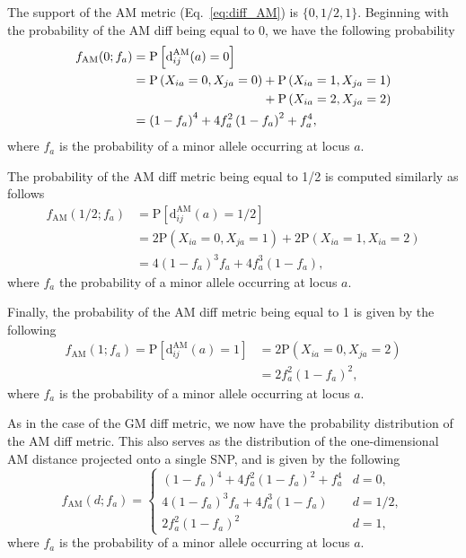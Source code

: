 \documentclass[aos]{imsart}
\begin{document}
The support of the AM metric (Eq.~\ref{eq:diff_AM}) is $\{0,1/2,1\}$. Beginning with the probability of the AM diff being equal to 0, we have the following probability
%
\begin{equation}\label{eq:probAM0}
\begin{aligned}
f_\text{AM}(0;f_a) &= \text{P}\left[\text{d}^\text{AM}_{ij}(a) = 0\right] \\
&= \text{P}\left(X_{ia}=0,X_{ja}=0\right) + \text{P}\left(X_{ia}=1,X_{ja}=1\right) \\
& \hspace{3.64cm} + \text{P}\left(X_{ia}=2,X_{ja}=2\right) \\
&= \left(1 - f_a\right)^4 + 4 f^2_a \left(1 - f_a\right)^2 + f^4_a,
\end{aligned}
\end{equation}
%
where $f_a$ is the probability of a minor allele occurring at locus $a$.

The probability of the AM diff metric being equal to 1/2 is computed similarly as follows
%
\begin{equation}\label{eq:probAM0.5}
\begin{aligned}
f_\text{AM}\left(1/2;f_a\right) &= \text{P}\left[\text{d}^\text{AM}_{ij}(a) = 1/2\right] \\
&= 2\text{P}\left(X_{ia}=0,X_{ja}=1\right) + 2\text{P}\left(X_{ia}=1,X_{ia}=2\right) \\
&= 4 \left(1 - f_a\right)^3 f_a + 4 f^3_a \left(1 - f_a\right),
\end{aligned}
\end{equation}
%
where $f_a$ the probability of a minor allele occurring at locus $a$.

Finally, the probability of the AM diff metric being equal to 1 is given by the following
%
\begin{equation}\label{eq:probAM1}
\begin{aligned}
f_\text{AM}(1;f_a) = \text{P}\left[\text{d}^\text{AM}_{ij}(a) = 1\right] &= 2 \text{P}\left(X_{ia}=0,X_{ja}=2\right) \\
&= 2 f^2_a \left(1 - f_a\right)^2,
\end{aligned}
\end{equation}
%
where $f_a$ is the probability of a minor allele occurring at locus $a$.

As in the case of the GM diff metric, we now have the probability distribution of the AM diff metric. This also serves as the distribution of the one-dimensional AM distance projected onto a single SNP, and is given by the following
%
\begin{equation}\label{eq:AMdiffPDF}
f_\text{AM}(d;f_a) = \begin{cases}
\left(1 - f_a\right)^4 + 4 f^2_a \left(1 - f_a\right)^2 + f^4_a & d=0, \\
4 \left(1 - f_a\right)^3 f_a + 4 f^3_a \left(1 - f_a\right) & d=1/2, \\
2 f^2_a \left(1 - f_a\right)^2 & d=1,
\end{cases}
\end{equation}
%
where $f_a$ is the probability of a minor allele occurring at locus $a$.
\end{document}
